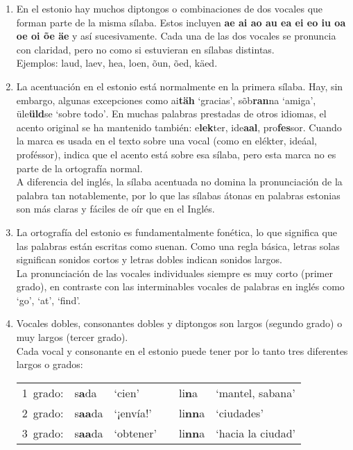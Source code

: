 \begin{enumerate}
 	\item En el estonio hay muchos diptongos o combinaciones de dos vocales que forman parte de la misma sílaba. Estos incluyen \textbf{ae ai ao au ea ei eo iu oa oe oi õe äe} y así sucesivamente. Cada una de las dos vocales se pronuncia con claridad, pero no como si estuvieran en sílabas distintas.\\

 	Ejemplos: laud, laev, hea, loen, õun, õed, käed.\\

 	\item La acentuación en el estonio está normalmente en la primera sílaba. Hay, sin embargo, algunas excepciones como \foreignlanguage{estonian}{ai\textbf{täh} `gracias', sõb\textbf{ran}na `amiga', üle\textbf{üld}se `sobre todo'}. En muchas palabras prestadas de otros idiomas, el acento original se ha mantenido también: e\textbf{lek}ter, ide\textbf{aal}, pro\textbf{fes}sor. Cuando la marca \textasciiacute es usada en el texto sobre una vocal (como en elékter, ideáal, proféssor), indica que el acento está sobre esa sílaba, pero esta marca no es parte de la ortografía normal.\\

 	A diferencia del inglés, la sílaba acentuada no domina la pronunciación de la palabra tan notablemente, por lo que las sílabas átonas en palabras estonias son más claras y fáciles de oír que en el Inglés.\\

 	\item La ortografía del estonio es fundamentalmente fonética, lo que significa que las palabras están escritas como suenan. Como una regla básica, letras solas significan sonidos cortos y letras dobles indican sonidos largos.\\

 	La pronunciación de las vocales individuales siempre es muy corto (primer grado), en contraste con las interminables vocales de palabras en inglés como `go', `at', `find'.\\

 	\item Vocales dobles, consonantes dobles y diptongos son largos (segundo grado) o muy largos (tercer grado).\\

 	Cada vocal y consonante en el estonio puede tener por lo tanto tres diferentes largos o grados:\\

 	\begin{tabular}{ r l l c l l}
 		1\textordmasculine\ grado: & s\textbf{a}da 					& `cien' 		& & li\textbf{n}a 					& `mantel, sabana' \\
 		2\textordmasculine\ grado: & s\textbf{aa}da 				& `¡envía!' 	& & li\textbf{nn}a 					& `ciudades' \\
 		3\textordmasculine\ grado: & \textasciigrave s\textbf{aa}da & `obtener' 	& & \textasciigrave li\textbf{nn}a 	& `hacia la ciudad' 
 	\end{tabular}


\end{enumerate}
